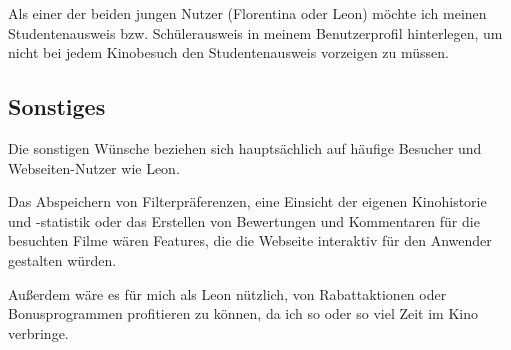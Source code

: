 Als einer der beiden jungen Nutzer (Florentina oder Leon) möchte ich meinen Studentenausweis bzw. Schülerausweis in meinem Benutzerprofil hinterlegen, um nicht bei jedem Kinobesuch den Studentenausweis vorzeigen zu müssen.

\subsection{Sonstiges}
Die sonstigen Wünsche beziehen sich hauptsächlich auf häufige Besucher und Webseiten-Nutzer wie Leon.

Das Abspeichern von Filterpräferenzen, eine Einsicht der eigenen Kinohistorie und -statistik oder das Erstellen von Bewertungen und Kommentaren für die besuchten Filme wären Features, die die Webseite interaktiv für den Anwender gestalten würden.

Außerdem wäre es für mich als Leon nützlich, von Rabattaktionen oder Bonusprogrammen profitieren zu können, da ich so oder so viel Zeit im Kino verbringe.
